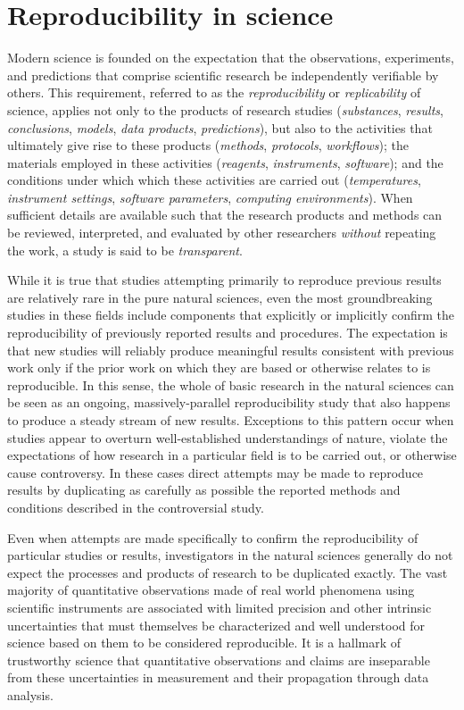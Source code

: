 \section{Reproducibility in science}

Modern science is founded on the expectation that the observations, experiments, and
	predictions that comprise scientific research be independently verifiable by others.
This requirement, referred to as the \emph{reproducibility} or \emph{replicability} of 
	science, applies not only to the products of research studies (\emph{substances}, 
	\emph{results}, \emph{conclusions}, \emph{models}, \emph{data products}, 
	\emph{predictions}), but also to the activities that ultimately give rise to these
	products (\emph{methods}, \emph{protocols}, \emph{workflows}); the materials 
	employed in these activities (\emph{reagents}, \emph{instruments}, 
	\emph{software}); and the conditions 
	under which which these activities are carried out (\emph{temperatures},
	\emph{instrument settings}, \emph{software parameters},
	\emph{computing environments}).  When sufficient details are available
	such that the research products and methods can be reviewed, interpreted, and
	evaluated by other researchers \emph{without} repeating the work, a study is said to be 
	\emph{transparent}.

While it is true that studies attempting primarily to reproduce previous results are relatively rare in the
	pure natural sciences, even the most groundbreaking studies in these fields include components	
	that explicitly or implicitly confirm the reproducibility of previously reported results and procedures.
The expectation is that new studies will reliably produce meaningful results consistent with previous work 
	only if the prior work on which they are based or otherwise relates to is reproducible.
In this sense, the whole of basic research in the natural sciences can be seen as an ongoing, massively-parallel
	reproducibility study that also happens to produce a steady stream of new results.
Exceptions to this pattern occur when studies appear to overturn well-established understandings of nature,
	violate the expectations of how research in a particular field is to be carried out, or otherwise cause controversy.
In these cases direct attempts may be made to reproduce results by duplicating as carefully as possible
	the reported methods and conditions described in the controversial study.

Even when attempts are made specifically to confirm the reproducibility of particular studies or results, investigators in
	the natural sciences generally do not expect the processes and products of research to be duplicated exactly.
The vast majority of quantitative observations made of real world phenomena using scientific instruments
	are associated with limited precision and other intrinsic uncertainties that must themselves be characterized
	and well understood for science based on them to be considered reproducible.
It is a hallmark of trustworthy science that quantitative observations and claims are inseparable from these 
	uncertainties in measurement and their propagation through data analysis.

